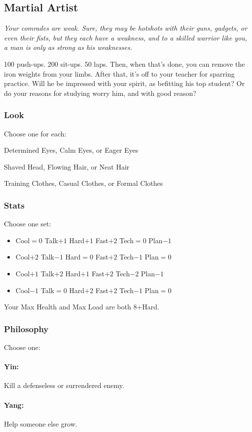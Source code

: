\subsection{Martial Artist}
{\itshape Your comrades are weak. Sure, they may be hotshots with
  their guns, gadgets, or even their fists, but they each have a
  weakness, and to a skilled warrior like you, a man is only as strong
  as his weaknesses.

100 push-ups. 200 sit-ups. 50 laps. Then, when that's done, you can
remove the iron weights from your limbs. After that, it's off to your
teacher for sparring practice. Will he be impressed with your spirit,
as befitting his top student? Or do your reasons for studying worry
him, and with good reason?}
\subsubsection{Look}
Choose one for each:

Determined Eyes, Calm Eyes, or Eager Eyes

Shaved Head, Flowing Hair, or Neat Hair

Training Clothes, Casual Clothes, or Formal Clothes

\subsubsection{Stats}
Choose one set:
\begin{itemize}
\setlength\itemsep{0em}
\item Cool${=}0$ Talk$+1$ Hard$+1$ Fast$+2$ Tech${=}0$ Plan$-1$
\item Cool$+2$ Talk$-1$ Hard${=}0$ Fast$+2$ Tech$-1$ Plan${=}0$
\item Cool$+1$ Talk$+2$ Hard$+1$ Fast$+2$ Tech$-2$ Plan$-1$
\item Cool$-1$ Talk${=}0$ Hard$+2$ Fast$+2$ Tech$-1$ Plan${=}0$
\end{itemize}

Your Max Health and Max Load are both 8+Hard.

\subsubsection{Philosophy}
Choose one:
\paragraph{Yin:} Kill a defenseless or surrendered enemy.
\paragraph{Yang:} Help someone else grow.

